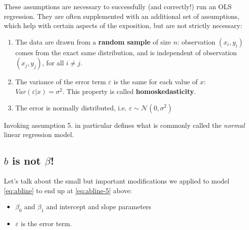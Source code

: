 \documentclass[]{book}
\providecommand{\tightlist}{%
  \setlength{\itemsep}{0pt}\setlength{\parskip}{0pt}}
\begin{document}
These assumptions are necessary to successfully (and correctly!) run an
OLS regression. They are often supplemented with an additional set of
assumptions, which help with certain aspects of the exposition, but are
not strictly necessary:

\begin{enumerate}
\def\labelenumi{\arabic{enumi}.}
\setcounter{enumi}{2}
\tightlist
\item
  The data are drawn from a \textbf{random sample} of size \(n\):
  observation \((x_i,y_i)\) comes from the exact same distribution, and
  is independent of observation \((x_j,y_j)\), for all \(i\neq j\).
\item
  The variance of the error term \(\varepsilon\) is the same for each
  value of \(x\): \(Var(\varepsilon|x) = \sigma^2\). This property is
  called \textbf{homoskedasticity}.
\item
  The error is normally distributed, i.e.
  \(\varepsilon \sim \mathcal{N}(0,\sigma^2)\)
\end{enumerate}

Invoking assumption 5. in particular defines what is commonly called the
\emph{normal} linear regression model.

\subsection{\texorpdfstring{\(b\) is not
\(\beta\)!}{b is not \textbackslash{}beta!}}\label{b-is-not-beta}

Let's talk about the small but important modifications we applied to
model \eqref{eq:abline} to end up at \eqref{eq:abline-5} above:

\begin{itemize}
\tightlist
\item
  \(\beta_0\) and \(\beta_1\) and intercept and slope parameters
\item
  \(\varepsilon\) is the error term.
\end{itemize}
\end{document}
